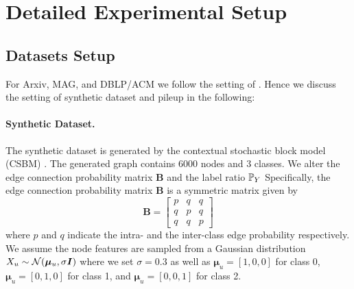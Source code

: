 \newpage
\section{Detailed Experimental Setup}
\label{app:exp}

\subsection{Datasets Setup}
For Arxiv, MAG, and DBLP/ACM we follow the setting of \cite{liu2024pairwise}. Hence we discuss the setting of synthetic dataset and pileup in the following:

\paragraph{Synthetic Dataset.}
The synthetic dataset is generated by the contextual stochastic block model (CSBM) \cite{deshpande2018contextual}. 
The generated graph contains 6000 nodes and 3 classes.
We alter the edge connection probability matrix $\mathbf{B}$ and the label ratio $\mathbb{P}_Y$
Specifically, the edge connection probability matrix $\mathbf{B}$ is a symmetric matrix given by
\[
\mathbf{B} = 
\begin{bmatrix}
p & q & q \\
q & p & q \\
q & q & p
\end{bmatrix}
\]
where $p$ and $q$ indicate the intra- and the inter-class edge probability respectively.
We assume the node features are sampled from a Gaussian distribution $X_u \sim {\mathcal{N}}(\bm{\mu}_u, \sigma{\bm{I}})$ where we set $\sigma=0.3$ as well as $\bm{\mu}_u=[1,0,0]$ for class 0, $\bm{\mu}_u=[0,1,0]$ for class 1, and $\bm{\mu}_u=[0,0,1]$ for class 2.


